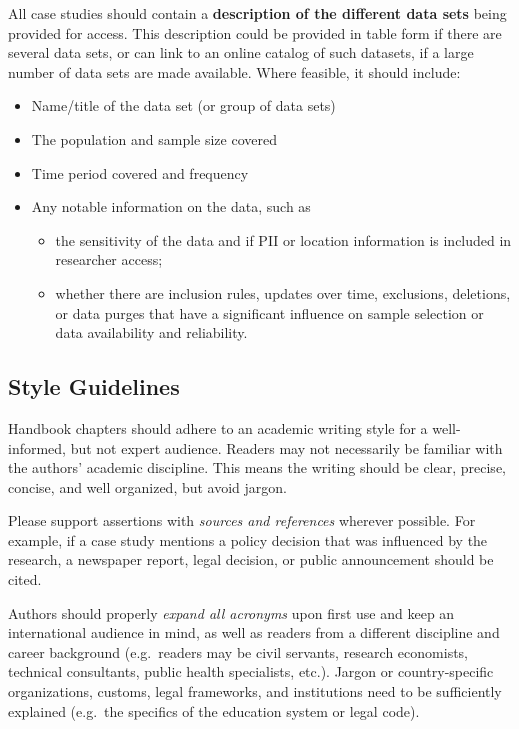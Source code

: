 \documentclass[
]{book}
\providecommand{\tightlist}{%
  \setlength{\itemsep}{0pt}\setlength{\parskip}{0pt}}
\begin{document}
All case studies should contain a \textbf{description of the different data sets} being provided for access. This description could be provided in table form if there are several data sets, or can link to an online catalog of such datasets, if a large number of data sets are made available. Where feasible, it should include:

\begin{itemize}
\tightlist
\item
  Name/title of the data set (or group of data sets)
\item
  The population and sample size covered
\item
  Time period covered and frequency
\item
  Any notable information on the data, such as

  \begin{itemize}
  \tightlist
  \item
    the sensitivity of the data and if PII or location information is included in researcher access;
  \item
    whether there are inclusion rules, updates over time, exclusions, deletions, or data purges that have a significant influence on sample selection or data availability and reliability.
  \end{itemize}
\end{itemize}

\hypertarget{style-guidelines}{%
\subsection*{Style Guidelines}\label{style-guidelines}}

Handbook chapters should adhere to an academic writing style for a well-informed, but not expert audience. Readers may not necessarily be familiar with the authors' academic discipline. This means the writing should be clear, precise, concise, and well organized, but avoid jargon.

Please support assertions with \emph{sources and references} wherever possible. For example, if a case study mentions a policy decision that was influenced by the research, a newspaper report, legal decision, or public announcement should be cited.

Authors should properly \emph{expand all acronyms} upon first use and keep an international audience in mind, as well as readers from a different discipline and career background (e.g.~readers may be civil servants, research economists, technical consultants, public health specialists, etc.). Jargon or country-specific organizations, customs, legal frameworks, and institutions need to be sufficiently explained (e.g.~the specifics of the education system or legal code).
\end{document}

